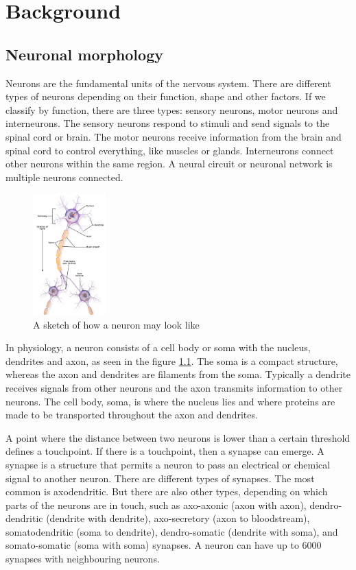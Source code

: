\chapter{Background}
\label{chapter:background}

\section{Neuronal morphology}
Neurons are the fundamental units of the nervous system.  There are different types of neurons depending on their function, shape and other factors. If we classify by function, there are three types: sensory neurons, motor neurons and interneurons. The sensory neurons respond to stimuli and send signals to the spinal cord or brain. The motor neurons receive information from the brain and spinal cord to control everything, like muscles or glands. Interneurons connect other neurons within the same region. A neural circuit or neuronal network is multiple neurons connected.
\begin{figure}
    \centering
    \includegraphics[width=0.25\textwidth]{setup/img/NeuronParts.png}
    \caption{A sketch of how a neuron may look like \cite{wiki:interneurons}}
    \label{fig:NeuronParts}
\end{figure}

In physiology, a neuron consists of a cell body or soma with the nucleus, dendrites and axon, as seen in the figure \ref{fig:NeuronParts}. The soma is a compact structure, whereas the axon and dendrites are filaments from the soma. Typically a dendrite receives signals from other neurons and the axon transmits information to other neurons. The cell body, soma, is where the nucleus lies and where proteins are made to be transported throughout the axon and dendrites.

A point where the distance between two neurons is lower than a certain threshold defines a touchpoint. If there is a touchpoint, then a synapse can emerge. A synapse is a structure that permits a neuron to pass an electrical or chemical signal to another neuron. There are different types of synapses. The most common is axodendritic. But there are also other types, depending on which parts of the neurons are in touch, such as axo-axonic (axon with axon), dendro-dendritic (dendrite with dendrite), axo-secretory (axon to bloodstream), somatodendritic (soma to dendrite), dendro-somatic (dendrite with soma), and somato-somatic (soma with soma) synapses. A neuron can have up to 6000 synapses with neighbouring neurons\cite{Sherwood2020}.

